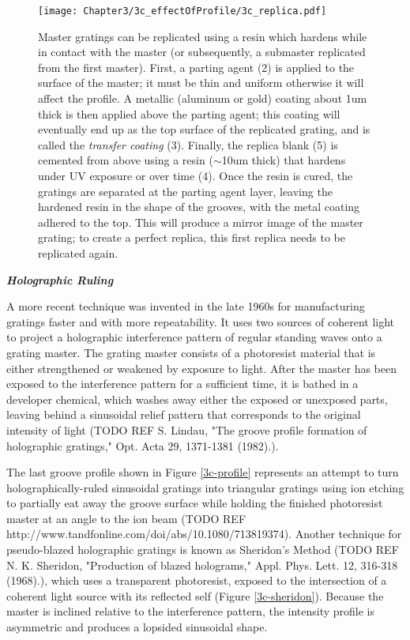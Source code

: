 \begin{figure}[htbp] %
   \centering
   \texttt{[image: Chapter3/3c\_effectOfProfile/3c\_replica.pdf]}
   \caption{Master gratings can be replicated using a resin which hardens while in contact with the master (or subsequently, a submaster replicated from the first master).  First, a parting agent (2) is applied to the surface of the master; it must be thin and uniform otherwise it will affect the profile.  A metallic (aluminum or gold) coating about 1um thick is then applied above the parting agent; this coating will eventually end up as the top surface of the replicated grating, and is called the \emph{transfer coating} (3).  Finally, the replica blank (5) is cemented from above using a resin ($\sim$10um thick) that hardens under UV exposure or over time (4).  Once the resin is cured, the gratings are separated at the parting agent layer, leaving the hardened resin in the shape of the grooves, with the metal coating adhered to the top.  This will produce a mirror image of the master grating; to create a perfect replica, this first replica needs to be replicated again.}
   \label{3c-replication}
\end{figure}

\noindent \textbf{\emph{Holographic Ruling}}

\noindent A more recent technique was invented in the late 1960s for manufacturing gratings faster and with more repeatability.  It uses two sources of coherent light to project a  holographic interference pattern of regular standing waves onto a grating master.  The grating master consists of a photoresist material that is either strengthened or weakened by exposure to light.  After the master has been exposed to the interference pattern for a sufficient time, it is bathed in a developer chemical, which washes away either the exposed or unexposed parts, leaving behind a sinusoidal relief pattern that corresponds to the original intensity of light (TODO REF  S. Lindau, "The groove profile formation of holographic gratings," Opt. Acta 29, 1371-1381 (1982).).

The last groove profile shown in Figure \ref{3c-profile} represents an attempt to turn holographically-ruled sinusoidal gratings into triangular gratings using ion etching to partially eat away the groove surface while holding the finished photoresist master at an angle to the ion beam (TODO REF http://www.tandfonline.com/doi/abs/10.1080/713819374).  Another technique for pseudo-blazed holographic gratings is known as Sheridon's Method (TODO REF N. K. Sheridon, "Production of blazed holograms," Appl. Phys. Lett. 12, 316-318 (1968).), which uses a transparent photoresist, exposed to the intersection of a coherent light source with its reflected self (Figure \ref{3c-sheridon}).  Because the master is inclined relative to the interference pattern, the intensity profile is asymmetric and produces a lopsided sinusoidal shape.

